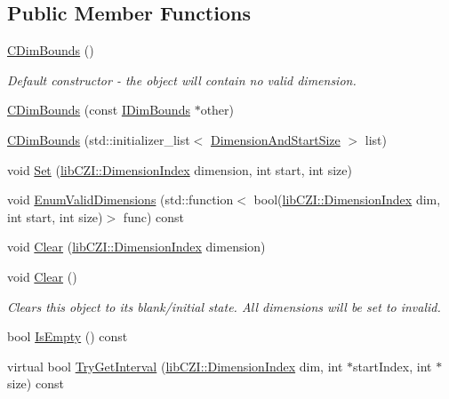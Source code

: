 \subsection*{Public Member Functions}
\begin{DoxyCompactItemize}
\item 
\mbox{\label{classlib_c_z_i_1_1_c_dim_bounds_a86cb06505f8ac0cf75a9258f49ef58dc}} 
\hyperlink{classlib_c_z_i_1_1_c_dim_bounds_a86cb06505f8ac0cf75a9258f49ef58dc}{C\+Dim\+Bounds} ()
\begin{DoxyCompactList}\small\item\em Default constructor -\/ the object will contain no valid dimension. \end{DoxyCompactList}\item 
\hyperlink{classlib_c_z_i_1_1_c_dim_bounds_a176e01bb95a50cecf18f0e172937151e}{C\+Dim\+Bounds} (const \hyperlink{classlib_c_z_i_1_1_i_dim_bounds}{I\+Dim\+Bounds} $\ast$other)
\item 
\hyperlink{classlib_c_z_i_1_1_c_dim_bounds_aae378201c633fa582d3af0740b1b634a}{C\+Dim\+Bounds} (std\+::initializer\+\_\+list$<$ \hyperlink{structlib_c_z_i_1_1_dimension_and_start_size}{Dimension\+And\+Start\+Size} $>$ list)
\item 
void \hyperlink{classlib_c_z_i_1_1_c_dim_bounds_a7a872729a919b4573755032fbfdfc183}{Set} (\hyperlink{namespacelib_c_z_i_a55049658acf59d0eddfaebcad16df424}{lib\+C\+Z\+I\+::\+Dimension\+Index} dimension, int start, int size)
\item 
void \hyperlink{classlib_c_z_i_1_1_c_dim_bounds_ae2bddb983e507840449695dc2757cd2f}{Enum\+Valid\+Dimensions} (std\+::function$<$ bool(\hyperlink{namespacelib_c_z_i_a55049658acf59d0eddfaebcad16df424}{lib\+C\+Z\+I\+::\+Dimension\+Index} dim, int start, int size)$>$ func) const
\item 
void \hyperlink{classlib_c_z_i_1_1_c_dim_bounds_a96a5f7ec6f13896998eff3c7d2c7e5bf}{Clear} (\hyperlink{namespacelib_c_z_i_a55049658acf59d0eddfaebcad16df424}{lib\+C\+Z\+I\+::\+Dimension\+Index} dimension)
\item 
\mbox{\label{classlib_c_z_i_1_1_c_dim_bounds_a7e84b9c941feefe65e2a4005a3c58e14}} 
void \hyperlink{classlib_c_z_i_1_1_c_dim_bounds_a7e84b9c941feefe65e2a4005a3c58e14}{Clear} ()
\begin{DoxyCompactList}\small\item\em Clears this object to its blank/initial state. All dimensions will be set to invalid. \end{DoxyCompactList}\item 
bool \hyperlink{classlib_c_z_i_1_1_c_dim_bounds_a8c72a9198f5b88b1d3d68acdb79758ba}{Is\+Empty} () const
\item 
virtual bool \hyperlink{classlib_c_z_i_1_1_c_dim_bounds_abf42285e28ddc4843556f88b2292c494}{Try\+Get\+Interval} (\hyperlink{namespacelib_c_z_i_a55049658acf59d0eddfaebcad16df424}{lib\+C\+Z\+I\+::\+Dimension\+Index} dim, int $\ast$start\+Index, int $\ast$size) const
\end{DoxyCompactItemize}
